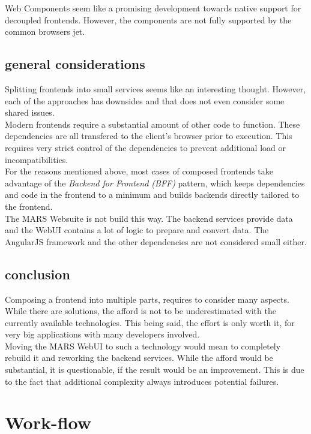 Web Components seem like a promising development towards native support for decoupled frontends. However, the components are not fully supported by the common browsers jet.


\subsection{general considerations}
Splitting frontends into small services seems like an interesting thought. However, each of the approaches has downsides and that does not even consider some shared issues.\\
Modern frontends require a substantial amount of other code to function. These dependencies are all transfered to the client's browser prior to execution. This requires very strict control of the dependencies to prevent additional load or incompatibilities.\\
For the reasons mentioned above, most cases of composed frontends take advantage of the \textit{Backend for Frontend (BFF)} pattern, which keeps dependencies and code in the frontend to a minimum and builds backends directly tailored to the frontend.\\
The MARS Websuite is not build this way. The backend services provide data and the WebUI contains a lot of logic to prepare and convert data. The AngularJS framework and the other dependencies are not considered small either.\\


\subsection{conclusion}
Composing a frontend into multiple parts, requires to consider many aspects. While there are solutions, the afford is not to be underestimated with the currently available technologies. This being said, the effort is only worth it, for very big applications with many developers involved.\\
Moving the MARS WebUI to such a technology would mean to completely rebuild it and reworking the backend services. While the afford would be substantial, it is questionable, if the result would be an improvement. This is due to the fact that additional complexity always introduces potential failures.


\section{Work-flow}

